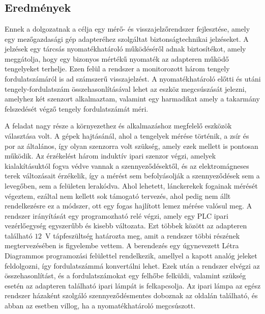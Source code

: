 \chapter{\osszefoglalas} %

\section{Eredmények}

Ennek a dolgozatnak a célja egy mérő- és visszajelzőrendszer fejlesztése, amely egy mezőgazdasági gép adapteréhez szolgáltat biztonságtechnikai jelzéseket. A jelzések egy tárcsás nyomatékhatároló működéséről adnak biztosítékot, amely meggátolja, hogy egy bizonyos mértékű nyomaték az adapteren működő tengelyeket terhelje. Ezen felül a rendszer a monitorozott három tengely fordulatszámáról is ad számszerű visszajelzést. A nyomatékhatároló előtti és utáni tengely-fordulatszám összehasonlításával lehet az eszköz megcsúszását jelezni, amelyhez két szenzort alkalmaztam, valamint egy harmadikat amely a takarmány felszedését végző tengely fordulatszámát méri.

A feladat nagy része a környezethez és alkalmazáshoz megfelelő eszközök választása volt. A gépek hajtásánál, ahol a tengelyek mérése történik, a zsír és por az általános, így olyan szenzorra volt szükség, amely ezek mellett is pontosan működik. Az érzékelést három induktív ipari szenzor végzi, amelyek kialakításuktól fogva védve vannak a szennyeződésektől, és az elektromágneses terek változásait érzékelik, így a mérést sem befolyásolják a szennyeződések sem a levegőben, sem a felületen lerakódva. Ahol lehetett, lánckerekek fogainak mérését végeztem, ezáltal nem kellett sok támogató tervezés, ahol pedig nem állt rendelkezésre ez a módszer, ott egy fogas hajlított lemez mérése valósul meg. A rendszer irányítását egy programozható relé végzi, amely egy PLC ipari vezérlőegység egyszerűbb és kisebb változata. Ezt többek között az adapteren található $12$~V tápfeszültség határozta meg, amit a rendszer többi részének megtervezésében is figyelembe vettem. A berendezés egy úgynevezett Létra Diagrammos programozási felülettel rendelkezik, amellyel a kapott analóg jeleket feldolgozni, így fordulatszámmá konvertálni lehet. Ezek után a rendszer elvégzi az összehasonlítást, és a fordulatszámokat egy felhőbe felküldi, valamint szükség esetén az adapteren található ipari lámpát is felkapcsolja. Az ipari lámpa az egész rendszer házaként szolgáló szennyeződésmentes doboznak az oldalán található, és abban az esetben villog, ha a nyomatékhatároló megcsúszott.

